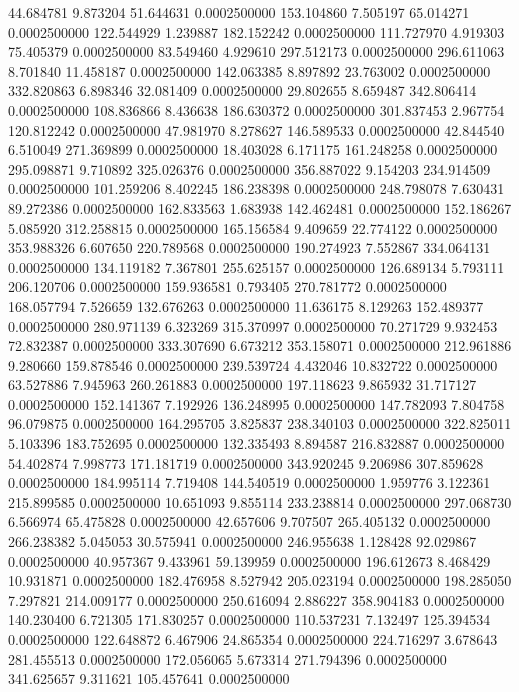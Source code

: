44.684781 9.873204 51.644631 0.0002500000
153.104860 7.505197 65.014271 0.0002500000
122.544929 1.239887 182.152242 0.0002500000
111.727970 4.919303 75.405379 0.0002500000
83.549460 4.929610 297.512173 0.0002500000
296.611063 8.701840 11.458187 0.0002500000
142.063385 8.897892 23.763002 0.0002500000
332.820863 6.898346 32.081409 0.0002500000
29.802655 8.659487 342.806414 0.0002500000
108.836866 8.436638 186.630372 0.0002500000
301.837453 2.967754 120.812242 0.0002500000
47.981970 8.278627 146.589533 0.0002500000
42.844540 6.510049 271.369899 0.0002500000
18.403028 6.171175 161.248258 0.0002500000
295.098871 9.710892 325.026376 0.0002500000
356.887022 9.154203 234.914509 0.0002500000
101.259206 8.402245 186.238398 0.0002500000
248.798078 7.630431 89.272386 0.0002500000
162.833563 1.683938 142.462481 0.0002500000
152.186267 5.085920 312.258815 0.0002500000
165.156584 9.409659 22.774122 0.0002500000
353.988326 6.607650 220.789568 0.0002500000
190.274923 7.552867 334.064131 0.0002500000
134.119182 7.367801 255.625157 0.0002500000
126.689134 5.793111 206.120706 0.0002500000
159.936581 0.793405 270.781772 0.0002500000
168.057794 7.526659 132.676263 0.0002500000
11.636175 8.129263 152.489377 0.0002500000
280.971139 6.323269 315.370997 0.0002500000
70.271729 9.932453 72.832387 0.0002500000
333.307690 6.673212 353.158071 0.0002500000
212.961886 9.280660 159.878546 0.0002500000
239.539724 4.432046 10.832722 0.0002500000
63.527886 7.945963 260.261883 0.0002500000
197.118623 9.865932 31.717127 0.0002500000
152.141367 7.192926 136.248995 0.0002500000
147.782093 7.804758 96.079875 0.0002500000
164.295705 3.825837 238.340103 0.0002500000
322.825011 5.103396 183.752695 0.0002500000
132.335493 8.894587 216.832887 0.0002500000
54.402874 7.998773 171.181719 0.0002500000
343.920245 9.206986 307.859628 0.0002500000
184.995114 7.719408 144.540519 0.0002500000
1.959776 3.122361 215.899585 0.0002500000
10.651093 9.855114 233.238814 0.0002500000
297.068730 6.566974 65.475828 0.0002500000
42.657606 9.707507 265.405132 0.0002500000
266.238382 5.045053 30.575941 0.0002500000
246.955638 1.128428 92.029867 0.0002500000
40.957367 9.433961 59.139959 0.0002500000
196.612673 8.468429 10.931871 0.0002500000
182.476958 8.527942 205.023194 0.0002500000
198.285050 7.297821 214.009177 0.0002500000
250.616094 2.886227 358.904183 0.0002500000
140.230400 6.721305 171.830257 0.0002500000
110.537231 7.132497 125.394534 0.0002500000
122.648872 6.467906 24.865354 0.0002500000
224.716297 3.678643 281.455513 0.0002500000
172.056065 5.673314 271.794396 0.0002500000
341.625657 9.311621 105.457641 0.0002500000
